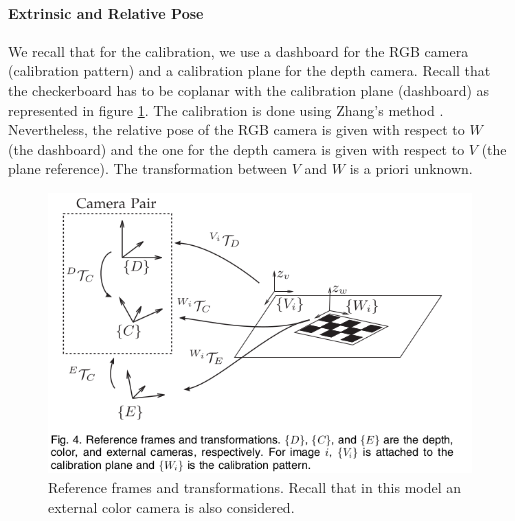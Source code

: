\documentclass[11pt,a4paper]{article}
\begin{document}
\paragraph{Extrinsic and Relative Pose} We recall that for the calibration, we use a dashboard for the RGB camera (calibration pattern) and a calibration plane for the depth camera. Recall that the checkerboard has to be coplanar with the calibration plane (dashboard) as represented in figure \ref{ReferenceFrames_Herrera}. The calibration is done using Zhang's method \cite{Zhang2000}. Nevertheless, the relative pose of the RGB camera is given with respect to $W$ (the dashboard) and the one for the depth camera is given with respect to $V$ (the plane reference). The transformation between $V$ and $W$ is a priori unknown. 

\begin{figure}[!ht]
\centering
\includegraphics[scale=0.6]{Pictures/ReferenceFrames_Herrera.png}
\caption{ Reference frames and transformations. Recall that in this model an external color camera is also considered. \label{ReferenceFrames_Herrera}}
\end{figure}
\end{document}
